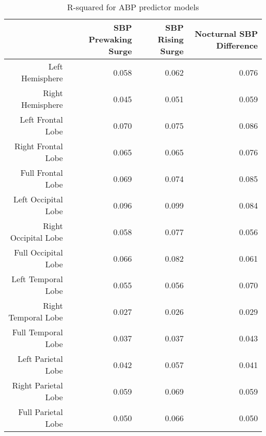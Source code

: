 \documentclass[10pt]{article}\usepackage[]{graphicx}\usepackage[]{color}
\begin{document}
\begin{table}[ht]
\centering
\caption{R-squared for ABP predictor models} 
\begin{tabular}{rrrr}
  \hline
 & SBP Prewaking Surge & SBP Rising Surge & Nocturnal SBP Difference \\ 
  \hline
Left Hemisphere & 0.058 & 0.062 & 0.076 \\ 
  Right Hemisphere & 0.045 & 0.051 & 0.059 \\ 
  Left Frontal Lobe & 0.070 & 0.075 & 0.086 \\ 
  Right Frontal Lobe & 0.065 & 0.065 & 0.076 \\ 
  Full Frontal Lobe & 0.069 & 0.074 & 0.085 \\ 
  Left Occipital Lobe & 0.096 & 0.099 & 0.084 \\ 
  Right Occipital Lobe & 0.058 & 0.077 & 0.056 \\ 
  Full Occipital Lobe & 0.066 & 0.082 & 0.061 \\ 
  Left Temporal Lobe & 0.055 & 0.056 & 0.070 \\ 
  Right Temporal Lobe & 0.027 & 0.026 & 0.029 \\ 
  Full Temporal Lobe & 0.037 & 0.037 & 0.043 \\ 
  Left Parietal Lobe & 0.042 & 0.057 & 0.041 \\ 
  Right Parietal Lobe & 0.059 & 0.069 & 0.059 \\ 
  Full Parietal Lobe & 0.050 & 0.066 & 0.050 \\ 
   \hline
\end{tabular}
\end{table}
\end{document}
